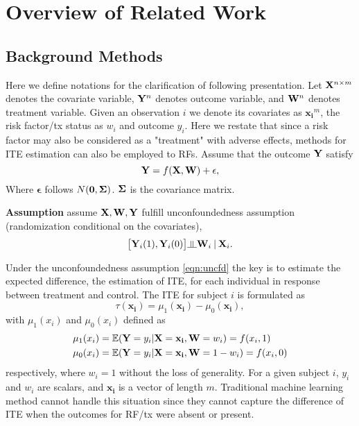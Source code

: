\section{Overview of Related Work}
\label{sec:ite_overview}
  \subsection{Background Methods}
    Here we define notations for the clarification of following presentation. Let $\mathbf{X}^{n \times m}$ denotes the covariate variable, $\mathbf{Y}^n$ denotes outcome variable, and $\mathbf{W}^n$ denotes treatment variable. Given an observation $i$ we denote its covariates as $\mathbf{x_i}^m$, the risk factor/tx status as $w_i$ and outcome $y_i$. Here we restate that since a risk factor may also be considered as a "treatment" with adverse effects, methods for ITE estimation can also be employed to RFs. Assume that the outcome $\mathbf{Y}$ satisfy
    \begin{equation}
      \mathbf{Y} = f (\mathbf{X}, \mathbf{W}) + \mathbf{\epsilon},
    \end{equation}
    Where $\mathbf{\epsilon}$ follows $N(\mathbf{0}, \bm\Sigma)$. $\bm\Sigma$ is the covariance matrix.

    \textbf{Assumption} assume $\mathbf{X}, \mathbf{W}, \mathbf{Y}$ fulfill unconfoundedness assumption (randomization conditional on the covariates), 
    \begin{equation}
      \label{eqn:uncfd}
      \big[ \bY_i(1), \bY_i(0) \big] \indep \bW_i \given \bX_i. 
    \end{equation}
    
    Under the unconfoundedness assumption \ref{eqn:uncfd} the key is to estimate the expected difference, the estimation of ITE, for each individual in response between treatment and control. The ITE for subject $i$ is formulated as 
    \begin{equation}
      \tau(\mathbf{x_i}) = \mu_1 (\mathbf{x_i}) - \mu_0 (\mathbf{x_i}),
    \end{equation}
    with $\mu_1(x_i)$ and $\mu_0(x_i)$ defined as 
    \begin{equation}
      \label{eqn:ite_tau}
      \begin{split}
        \mu_1(x_i) & = \mathbb{E}(\mathbf{Y} = y_i|\mathbf{X}=\mathbf{x_i}, \mathbf{W} = w_i) = f(x_i, 1)\\
        \mu_0(x_i) & = \mathbb{E}(\mathbf{Y} = y_i|\mathbf{X}=\mathbf{x_i}, \mathbf{W} = 1 - w_i) = f(x_i, 0)
      \end{split}
    \end{equation} 
    respectively, where $w_i = 1$ without the loss of generality. For a given subject $i$, $y_i$ and $w_i$ are scalars, and $\mathbf{x_i}$ is a vector of length $m$. 
    Traditional machine learning method cannot handle this situation since they cannot capture the difference of ITE when the outcomes for RF/tx were absent or present. 

